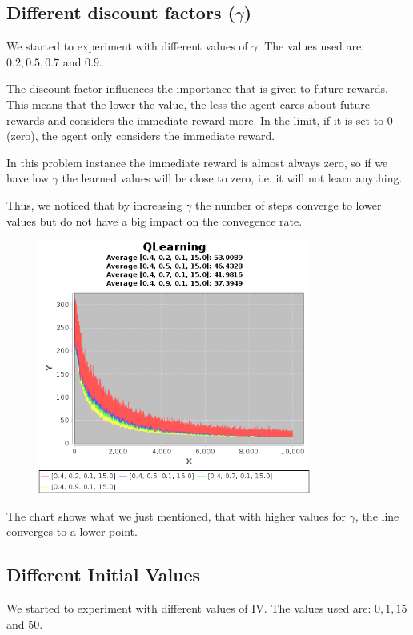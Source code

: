 \documentclass{article}
\begin{document}
\subsection{Different discount factors ($\gamma$)}
We started to experiment with different values of $\gamma$. The values used are:
$0.2, 0.5, 0.7$ and $0.9$. 

The discount factor influences the importance that is given to future rewards.
This means that the lower the value, the less the agent cares about future
rewards and considers the immediate reward more. In the limit, if it is set to $0$ (zero), the agent only considers the immediate reward.

In this problem instance the immediate reward is almost always zero, so if we
have low $\gamma$ the learned values will be close to zero, i.e. it will not
learn anything. 

Thus, we noticed that by increasing $\gamma$ the number of steps converge to
lower values but do not have a big impact on the convegence rate.

\begin{figure}[htbp]
\centering
\includegraphics[width=0.8\textwidth]{res/alpha_04_gama_02_to_09_epsilon_01_IV_15.png}
\end{figure}

The chart shows what we just mentioned, that with higher values for $\gamma$, the line converges to a lower point.

\subsection{Different Initial Values}
We started to experiment with different values of IV. The values used are:
$0, 1, 15$ and $50$. 
\end{document}
